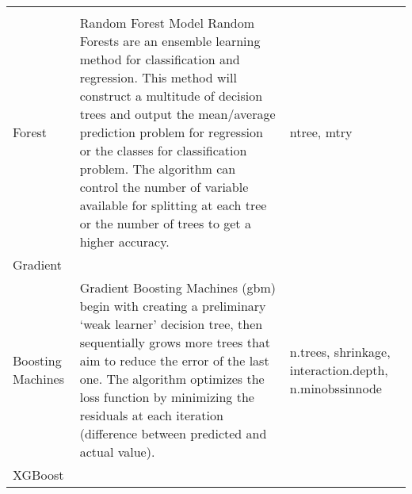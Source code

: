 \documentclass[11pt,]{article}
\begin{document}
\begin{longtable}[]{@{}lll@{}}
\begin{minipage}[t]{0.73\columnwidth}
\strut
\end{minipage} & \begin{minipage}[t]{0.13\columnwidth}\raggedright
\strut
\end{minipage}\tabularnewline
\begin{minipage}[t]{0.05\columnwidth}\raggedright
Forest\strut
\end{minipage} & \begin{minipage}[t]{0.73\columnwidth}\raggedright
Random Forest Model Random Forests are an ensemble learning method for
classification and regression. This method will construct a multitude of
decision trees and output the mean/average prediction problem for
regression or the classes for classification problem. The algorithm can
control the number of variable available for splitting at each tree or
the number of trees to get a higher accuracy.\strut
\end{minipage} & \begin{minipage}[t]{0.13\columnwidth}\raggedright
ntree, mtry\strut
\end{minipage}\tabularnewline
\begin{minipage}[t]{0.05\columnwidth}\raggedright
Gradient\strut
\end{minipage} & \begin{minipage}[t]{0.73\columnwidth}\raggedright
\strut
\end{minipage} & \begin{minipage}[t]{0.13\columnwidth}\raggedright
\strut
\end{minipage}\tabularnewline
\begin{minipage}[t]{0.05\columnwidth}\raggedright
Boosting Machines\strut
\end{minipage} & \begin{minipage}[t]{0.73\columnwidth}\raggedright
Gradient Boosting Machines (gbm) begin with creating a preliminary `weak
learner' decision tree, then sequentially grows more trees that aim to
reduce the error of the last one. The algorithm optimizes the loss
function by minimizing the residuals at each iteration (difference
between predicted and actual value).\strut
\end{minipage} & \begin{minipage}[t]{0.13\columnwidth}\raggedright
n.trees, shrinkage, interaction.depth, n.minobssinnode\strut
\end{minipage}\tabularnewline
\begin{minipage}[t]{0.05\columnwidth}\raggedright
XGBoost\strut
\end{minipage} & \begin{minipage}[t]{0.73\columnwidth}\raggedright

\end{minipage}
\end{longtable}
\end{document}
